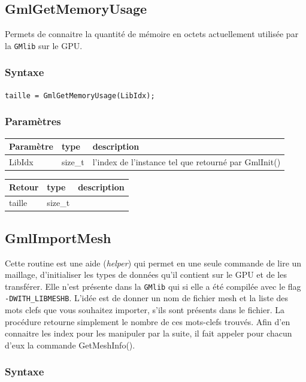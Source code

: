 \documentclass[a4paper,12pt]{article}
\begin{document}
\subsection{GmlGetMemoryUsage}

Permets de connaitre la quantité de mémoire en octets actuellement utilisée par la {\tt GMlib} sur le GPU.

\subsubsection*{Syntaxe}

{\tt taille = GmlGetMemoryUsage(LibIdx);}

\subsubsection*{Paramètres}

\begin{tabular}{|m{2cm}|m{1.5cm}|m{10.5cm}|}
\hline
Paramètre  & type    & description \\
\hline
LibIdx     & size\_t & l'index de l'instance tel que retourné par GmlInit() \\
\hline
\end{tabular}

\medskip

\begin{tabular}{|m{2cm}|m{1.5cm}|m{10.5cm}|}
\hline
Retour     & type    & description \\
\hline
taille     & size\_t & \\
\hline
\end{tabular}


\subsection{GmlImportMesh}

Cette routine est une aide (\emph{helper}) qui permet en une seule commande de lire un maillage, d'initialiser les types de données qu'il contient sur le GPU et de les transférer.
Elle n'est présente dans la {\tt GMlib} qui si elle a été compilée avec le flag {\tt -DWITH\_LIBMESHB}.
L'idée est de donner un nom de fichier mesh et la liste des mots clefs que vous souhaitez importer, s'ils sont présents dans le fichier.
La procédure retourne simplement le nombre de ces mots-clefs trouvés.
Afin d'en connaitre les index pour les manipuler par la suite, il fait appeler pour chacun d'eux la commande GetMeshInfo().

\subsubsection*{Syntaxe}
\end{document}
